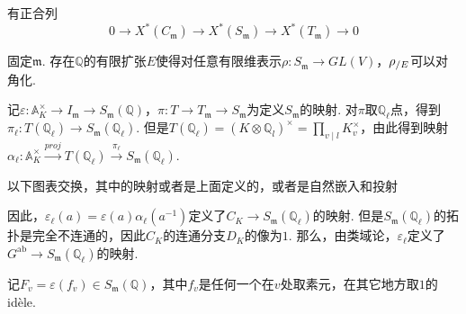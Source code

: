 \begin{cprop}
    有正合列
    \begin{equation}
        0 \to X^{*}(C_{\mathfrak{m}}) \to X^{*}(S_{\mathfrak{m}}) \to X^{*}(T_{\mathfrak{m}}) \to 0
    \end{equation}
\end{cprop}

\begin{cprop}
    固定$\mathfrak{m}$. 存在$\mathbb{Q}$的有限扩张$E$使得对任意有限维表示$\rho:S_{\mathfrak{m}}\to GL(V)$，${\rho}_{/E}$可以对角化. \label{reps::split_finite}
\end{cprop}


记$\varepsilon : \mathbb{A}_K^{\times} \to I_{\mathfrak{m}}\to S_{\mathfrak{m}}(\mathbb{Q})$，$\pi: T \to T_{\mathfrak{m}}\to S_{\mathfrak{m}}$为定义$S_{\mathfrak{m}}$的映射. 对$\pi$取$\mathbb{Q}_{\ell}$点，得到$\pi_{\ell} : T(\mathbb{Q}_{\ell}) \to S_{\mathfrak{m}}(\mathbb{Q}_{\ell})$. 但是$T(\mathbb{Q}_{\ell}) = (K\otimes \mathbb{Q}_l)^{\times} = \prod_{v\mid l} K_v^{\times}$，由此得到映射$\alpha_{\ell} : \mathbb{A}_K^{\times} \xrightarrow{proj} T(\mathbb{Q}_{\ell}) \xrightarrow{\pi_{\ell}} S_{\mathfrak{m}}(\mathbb{Q}_{\ell})$.

\begin{clem}
    以下图表交换，其中的映射或者是上面定义的，或者是自然嵌入和投射
    \begin{figure}[H]
        \centering
    \end{figure}
\end{clem}

因此，$\varepsilon_{\ell}(a) = \varepsilon(a) \alpha_{\ell}(a^{-1})$定义了$C_K \to S_{\mathfrak{m}}(\mathbb{Q}_{\ell})$的映射. 但是$S_{\mathfrak{m}}(\mathbb{Q}_{\ell})$的拓扑是完全不连通的，因此$C_K$的连通分支$D_K$的像为$1$. 那么，由类域论，$\varepsilon_{\ell}$定义了$G^{\mathrm{ab}}\to S_{\mathfrak{m}}(\mathbb{Q}_{\ell})$的映射.

记$F_v = \varepsilon(f_v) \in S_{\mathfrak{m}}(\mathbb{Q})$，其中$f_v$是任何一个在$v$处取素元，在其它地方取$1$的idèle.

